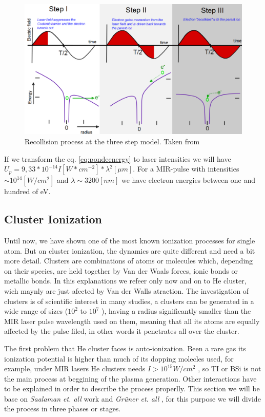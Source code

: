 \begin{figure}[hbtp]
\centering
\includegraphics[width=12 cm]{../Images/ponderomotive steps.png}
\caption[Ponderomotive 3 steps]{Recollision  process at the three step model. Taken from \cite{krishnan_doped_2011}}
\end{figure}


If we transform the eq. \ref{eq:pondeenergy} to laser intensities we will have $U_{p} = 9,33*10^{-14}I[W*cm^{-2}] * \lambda^{2}[\mu m]$. For a MIR-pulse with intensities $\sim 10^{14} [W/cm^{2}]$ and $\lambda \sim 3200 [nm]$ we have electron energies between one and hundred of eV.

\subsection{Cluster Ionization}

Until now, we have shown one of the most known ionization processes for single atom. But on cluster ionization, the dynamics are quite different and need a bit more detail. Clusters are combinations of atoms or molecules which, depending on their species, are held together by Van der Waals forces, ionic bonds or metallic bonds. In this explanations we refeer only now and on to He cluster, wich maynly are just afected by Van der Walls atraction. The investigation of clusters is of scientific interest in many studies, a clusters can be generated in a wide range of sizes ($10^{2}$ to $10^{7}$ )\cite{stienkemeier_spectroscopy_2006}, having a radius significantly smaller than the MIR laser pulse wavelength used on them, meaning that all its atoms are equally affected by the pulse filed, in other words it penetrates all over the cluster.

The first problem that He cluster faces is auto-ionization. Been a rare gas its ionization potential is higher than much of its dopping molecles used, for example, under MIR lasers He clusters needs $I > 10^{15} W/cm^{2}$ , so TI or BSi is not the main process at beggining of the plasma generation. Other interactions have to be explained in order to describe the process properlly. This section we will be base on \textit{Saalaman et. all} work \cite{saalmann_mechanisms_2006} and \textit{Grüner et. all} \cite{gruner_femtosekundenspektroskopie_2013}, for this purpose we will divide the process in three phases or stages.


